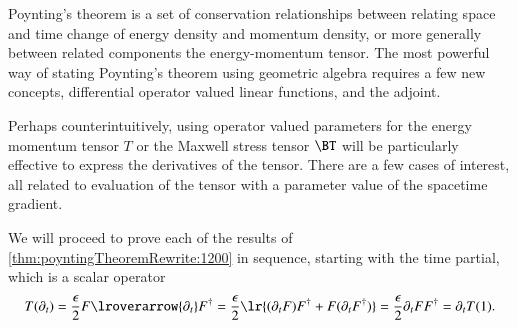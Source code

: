 %
%
Poynting's theorem is a set of conservation relationships between relating space and time change of energy density and momentum density, or more generally between related components the energy-momentum tensor.
The most powerful way of stating Poynting's theorem using geometric algebra requires a few new concepts, differential operator valued linear functions, and the adjoint.


Perhaps counterintuitively, using operator valued parameters for the energy momentum tensor \( T \) or the Maxwell stress tensor \( \BT \) will be particularly effective to express the derivatives of the tensor.  There are a few cases of interest, all related to evaluation of the tensor with a parameter value of the spacetime gradient.

We will proceed to prove each of the results of
\cref{thm:poyntingTheoremRewrite:1200} in sequence, starting with the time partial, which is a scalar operator
\begin{dmath}\label{eqn:poyntingTheoremRewrite:1220}
T(\partial_t)
=
\frac{\epsilon}{2}
 F \lroverarrow{\partial_t} F^\dagger
=
\frac{\epsilon}{2}
\lr{
 (\partial_t F) F^\dagger
+
 F (\partial_t F^\dagger)
}
=
\frac{\epsilon}{2}
\partial_t
 F F^\dagger
=
\partial_t T(1).
\end{dmath}

